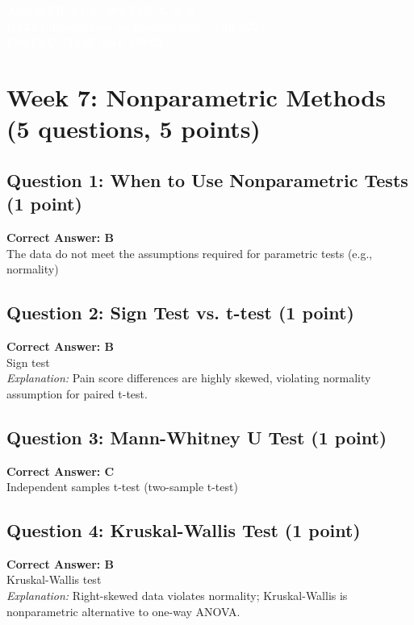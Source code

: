 \documentclass[10pt]{article}
\begin{document}
\begin{tcolorbox}[colback=osaorange,colframe=black,boxrule=2pt,arc=0pt,left=6pt,right=6pt,top=8pt,bottom=8pt]
\centering
\textcolor{white}{\textbf{\large ANSWER KEY: WEEKS 7, 8, 9}}\\
\textcolor{white}{\textbf{H524 Introduction to Biostatistics - Fall 2025}}\\
\textcolor{white}{\textbf{INSTRUCTOR USE ONLY}}
\end{tcolorbox}

\vspace{8pt}

\section*{Week 7: Nonparametric Methods (5 questions, 5 points)}

\subsection*{Question 1: When to Use Nonparametric Tests (1 point)}
\textbf{Correct Answer: \textcolor{correctcolor}{B}}\\
The data do not meet the assumptions required for parametric tests (e.g., normality)

\subsection*{Question 2: Sign Test vs. t-test (1 point)}
\textbf{Correct Answer: \textcolor{correctcolor}{B}}\\
Sign test\\
\textit{Explanation:} Pain score differences are highly skewed, violating normality assumption for paired t-test.

\subsection*{Question 3: Mann-Whitney U Test (1 point)}
\textbf{Correct Answer: \textcolor{correctcolor}{C}}\\
Independent samples t-test (two-sample t-test)

\subsection*{Question 4: Kruskal-Wallis Test (1 point)}
\textbf{Correct Answer: \textcolor{correctcolor}{B}}\\
Kruskal-Wallis test\\
\textit{Explanation:} Right-skewed data violates normality; Kruskal-Wallis is nonparametric alternative to one-way ANOVA.
\end{document}
